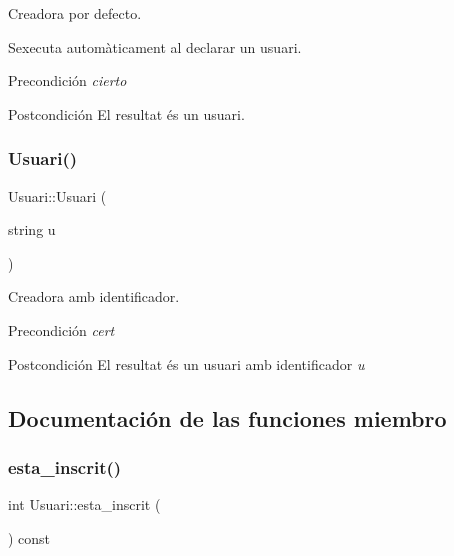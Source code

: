 Creadora por defecto. 

S\textquotesingle{}executa automàticament al declarar un usuari. \begin{DoxyPrecond}{Precondición}
{\itshape cierto} 
\end{DoxyPrecond}
\begin{DoxyPostcond}{Postcondición}
El resultat és un usuari. 
\end{DoxyPostcond}
\mbox{\label{class_usuari_a3e6c58812089cf0cf6ccd11d517d7ff3}} 
\subsubsection{\texorpdfstring{Usuari()}{Usuari()}\hspace{0.1cm}{\footnotesize\ttfamily [2/2]}}
{\footnotesize\ttfamily Usuari\+::\+Usuari (\begin{DoxyParamCaption}\item[{string}]{u }\end{DoxyParamCaption})}



Creadora amb identificador. 

\begin{DoxyPrecond}{Precondición}
{\itshape cert} 
\end{DoxyPrecond}
\begin{DoxyPostcond}{Postcondición}
El resultat és un usuari amb identificador {\itshape u{\itshape  }}
\end{DoxyPostcond}


\subsection{Documentación de las funciones miembro}
\mbox{\label{class_usuari_a0d20c2d77d8231d9a7e3e00a42a7e7c8}} 
\subsubsection{\texorpdfstring{esta\+\_\+inscrit()}{esta\_inscrit()}}
{\footnotesize\ttfamily int Usuari\+::esta\+\_\+inscrit (\begin{DoxyParamCaption}{ }\end{DoxyParamCaption}) const}



